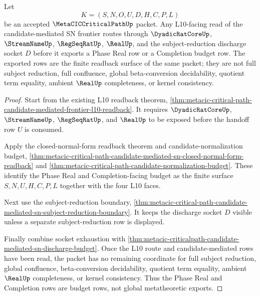\begin{theorem}
\label{thm:metacic-criticalpath-candidate-mediated-sn-l10-readback}
Let
$$
K=(S,N,O,U,D,H,C,P,L)
$$
be an accepted $\MetaCICCriticalPathUp$ packet. Any L10-facing read of the candidate-mediated SN frontier routes through $\DyadicRatCoreUp$, $\StreamNameUp$, $\RegSeqRatUp$, $\RealUp$, and the subject-reduction discharge socket $D$ before it exports a Phase Real row or a Completion budget row. The exported rows are the finite readback surface of the same packet; they are not full subject reduction, full confluence, global beta-conversion decidability, quotient term equality, ambient $\RealUp$ completeness, or kernel consistency.
\end{theorem}
\begin{proof}
Start from the existing L10 readback theorem, \autoref{thm:metacic-critical-path-candidate-mediated-frontier-l10-readback}. It requires $\DyadicRatCoreUp$, $\StreamNameUp$, $\RegSeqRatUp$, and $\RealUp$ to be exposed before the handoff row $U$ is consumed.

Apply the closed-normal-form readback theorem and candidate-normalization budget, \autoref{thm:metacic-critical-path-candidate-mediated-sn-closed-normal-form-readback} and \autoref{thm:metacic-critical-path-candidate-normalization-budget}. These identify the Phase Real and Completion-facing budget as the finite surface $S,N,U,H,C,P,L$ together with the four L10 faces.

Next use the subject-reduction boundary, \autoref{thm:metacic-critical-path-candidate-mediated-sn-subject-reduction-boundary}. It keeps the discharge socket $D$ visible unless a separate subject-reduction row is displayed.

Finally combine socket exhaustion with \autoref{thm:metacic-criticalpath-candidate-mediated-sn-discharge-budget}. Once the L10 route and candidate-mediated rows have been read, the packet has no remaining coordinate for full subject reduction, global confluence, beta-conversion decidability, quotient term equality, ambient $\RealUp$ completeness, or kernel consistency. Thus the Phase Real and Completion rows are budget rows, not global metatheoretic exports.
\end{proof}


